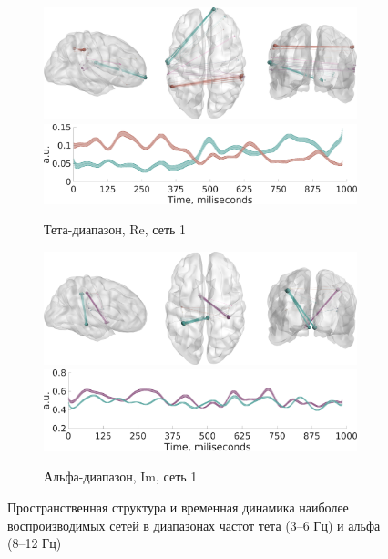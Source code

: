 \begin{figure}
\centering
{}

 \begin{subfigure}[b]{0.4\textwidth}
 \includegraphics[width=\textwidth]{../images/psiicos_paper/Figure11_a1.jpg}
 \includegraphics[width=\textwidth]{../images/psiicos_paper/Figure11_a2.jpg}
 \caption{Тета-диапазон, Re, сеть 1}\label{fig:11a}
 \end{subfigure}
 \hspace{1cm}
 \begin{subfigure}[b]{0.4\textwidth}
 \includegraphics[width=\textwidth]{../images/psiicos_paper/Figure11_b1.jpg}
 \includegraphics[width=\textwidth]{../images/psiicos_paper/Figure11_b2.jpg}
 \caption{Альфа-диапазон, Im, сеть 1}\label{fig:11b}
 \end{subfigure}
 \caption{Пространственная структура и временная динамика наиболее воспроизводимых сетей в диапазонах частот тета (3--6 Гц) и альфа (8--12 Гц)}\label{fig:11}
\end{figure} %

